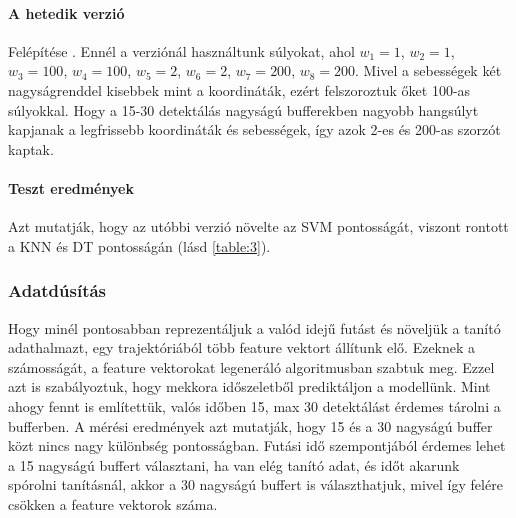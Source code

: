 \documentclass[acmtog, authorversion]{acmart}
\begin{document}
\paragraph{A hetedik verzió} Felépítése \begin{math}[x_0 * w_1, y_0 * w_2, v_{x_0} * w_3, v_{y_0} * w_4, x_l * w_5, y_l * w_6, v_{x_l} * w_7, v_{y_l} * w_8]\end{math}.
Ennél a verziónál használtunk súlyokat, ahol \begin{math}w_1=1\end{math}, \begin{math}w_2=1\end{math}, \begin{math}w_3=100\end{math}, \begin{math}w_4=100\end{math},
\begin{math}w_5=2\end{math}, \begin{math}w_6=2\end{math}, \begin{math}w_7=200\end{math}, \begin{math}w_8=200\end{math}. Mivel a sebességek két 
nagyságrenddel kisebbek mint a koordináták, ezért felszoroztuk őket 100-as súlyokkal. Hogy a 15-30 detektálás nagyságú bufferekben nagyobb hangsúlyt kapjanak a legfrissebb
koordináták és sebességek, így azok 2-es és 200-as szorzót kaptak.
\paragraph{Teszt eredmények} Azt mutatják, hogy az utóbbi verzió növelte az SVM pontosságát, viszont rontott a KNN és DT pontosságán (lásd \ref{table:3}).

\subsubsection{Adatdúsítás}
Hogy minél pontosabban reprezentáljuk a valód idejű futást és növeljük a tanító adathalmazt, egy trajektóriából több feature vektort állítunk elő.
Ezeknek a számosságát, a feature vektorokat legeneráló algoritmusban szabtuk meg. Ezzel azt is szabályoztuk, hogy mekkora időszeletből prediktáljon
a modellünk. Mint ahogy fennt is említettük, valós időben 15, max 30 detektálást érdemes tárolni a bufferben. A mérési eredmények azt mutatják, hogy
15 és a 30 nagyságú buffer közt nincs nagy különbség pontosságban. Futási idő szempontjából érdemes lehet a 15 nagyságú buffert választani,
ha van elég tanító adat, és időt akarunk spórolni tanításnál, akkor a 30 nagyságú buffert is választhatjuk, mivel így felére csökken a feature vektorok száma.
\end{document}
